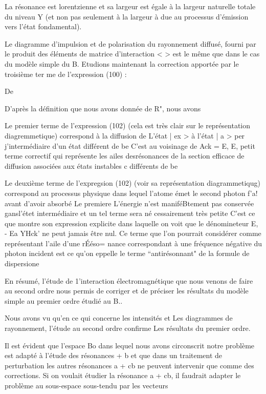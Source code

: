 La résonance est lorentzienne et sa largeur est égale à la largeur naturelle totale du niveau Y (et non pas seulement à la largeur à due
au processus d'émission vers l'état fondamental).

 Le diagramme d'impulsion et de polarisation du rayonnement diffusé, fourni par le produit des éléments de matrice d'interaction
<  > est le même que dans le cas du modèle simple
du  B.
Etudions maintenant la correction apportée par le troisième ter
me de l'expression (100) :

De

D'après la définition que nous avons donnée de R", nous avons

Le premier terme de l'expression (102) (cela est très clair
sur le représentation diagremmetique) correspond à la diffusion de L'état
| ex > à l'état | a > per j'intermédiaire d'un état  différent de be
C'est au voisinage de Ack = E, E, petit terme correctif qui représente
les ailes desrésonances de la section efficace de diffusion associées aux
états instables c différents de be

Le deuxième terme de l'expregsion (102) (voir sa représentation
diagrammetiqug) correspond au processus physique dans lequel l'atome émet
le second photon f'a! avant d'avoir absorbé Le premiere L'énergie n'est maniféBtement pas conservée gansl'étet intermédiaire et un tel terme sera né
cessairement très petite C'est ce que montre son expression explicite dans
laquelle on voit que le dénomineteur E, - Ea YHck' ne peut jamais être nul.
Ce terme que l'on pourrait considérer comme représentant l'aile d'une rÉéso=
nance correspondant à une fréquence négative du photon incident est ce qu'on
eppelle le terme “antirésonnant" de la formule de dispersione

En résumé, l'étude de 1'interaction électromagnétique que nous
venons de faire au second ordre nous  permis de corriger et de préciser les
résultats du modèle simple au premier ordre étudié au  B..

Nous avons vu qu'en ce qui concerne les intensités et Les diagrammes de rayonnement, l'étude au second ordre confirme Les résultats du premier
ordre.


Il est évident que l'espace Bo dans lequel nous avons circonscrit notre problème est adapté à l'étude des résonances  + b et que dans un traitement de
perturbation les autres résonances a + cb ne peuvent intervenir que comme des
corrections. Si on voulait étudier la résonance a + cb, il faudrait adapter
le problème au sous-espace  sous-tendu par les vecteurs

